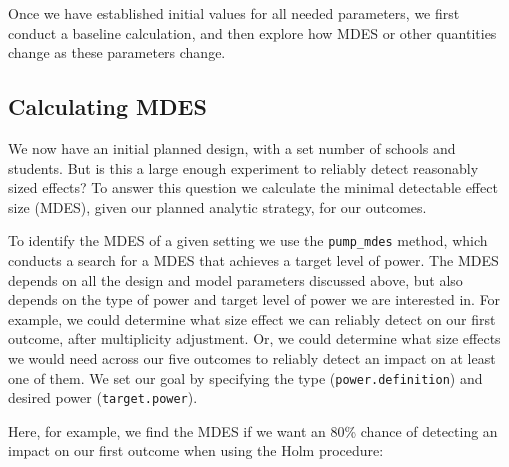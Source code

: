\documentclass[
]{article}
\begin{document}
Once we have established initial values for all needed parameters, we
first conduct a baseline calculation, and then explore how MDES or other
quantities change as these parameters change.

\subsection{Calculating MDES}

We now have an initial planned design, with a set number of schools and
students. But is this a large enough experiment to reliably detect
reasonably sized effects? To answer this question we calculate the
minimal detectable effect size (MDES), given our planned analytic
strategy, for our outcomes.

To identify the MDES of a given setting we use the \texttt{pump\_mdes}
method, which conducts a search for a MDES that achieves a target level
of power. The MDES depends on all the design and model parameters
discussed above, but also depends on the type of power and target level
of power we are interested in. For example, we could determine what size
effect we can reliably detect on our first outcome, after multiplicity
adjustment. Or, we could determine what size effects we would need
across our five outcomes to reliably detect an impact on at least one of
them. We set our goal by specifying the type (\texttt{power.definition})
and desired power (\texttt{target.power}).

Here, for example, we find the MDES if we want an 80\% chance of
detecting an impact on our first outcome when using the Holm procedure:
\end{document}
